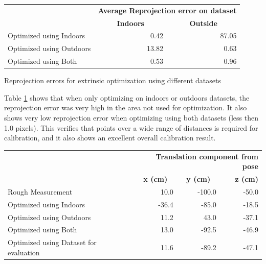 \begin{table}[H]
   \begin{tabular}{ p{6cm} r r }
    \toprule
    & \multicolumn{2}{r}{\bf{Average Reprojection error on dataset}}  \\
    & \multicolumn{1}{c}{\hspace*{2cm}\bf{Indoors}} & \multicolumn{1}{c}{\hspace*{2cm}\bf{Outside}} \\
    \midrule
    Optimized using Indoors  & 0.42  & 87.05 \\
    Optimized using Outdoors & 13.82 & 0.63 \\
    Optimized using Both     & 0.53  & 0.96 \\ 
    \bottomrule
    \end{tabular}
     {Reprojection errors for extrinsic optimization using different datasets} 
  \label{tab:reprojection_error}
\end{table}



Table \ref{tab:reprojection_error} shows that when only optimizing on indoors or outdoors datasets, the reprojection error was very high in the area not used for optimization.  It also shows very low reprojection error when optimizing using both datasets (less then 1.0 pixels).  This verifies that points over a wide range of distances is required for calibration, and it also shows an excellent overall calibration result.

\begin{table}[H]
    \begin{tabular}{ p{6.5cm} r r r} %
    \toprule
    & \multicolumn{3}{r}{\bf{Translation component from pose}}  \\
    & \multicolumn{1}{c}{\hspace*{0.8cm}\bf{x (cm)}} & \multicolumn{1}{c}{\hspace*{0.4cm}\bf{y (cm)}} & \hspace*{0.4cm}\bf{z (cm)} \\
    \midrule
    Rough Measurement & 10.0 & -100.0 & -50.0 \\
    Optimized using Indoors & -36.4 & -85.0 & -18.5\\
    Optimized using Outdoors & 11.2 & 43.0 & -37.1 \\
    Optimized using Both & 13.0 & -92.5 & -46.9 \\ 
    Optimized using Dataset for evaluation & 11.6 & -89.2 & -47.1  \\ 
    \bottomrule
    \end{tabular}
  \label{tab:geometry}
\end{table}

